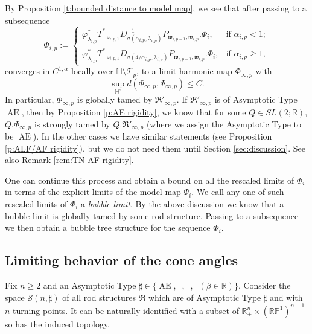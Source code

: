 \documentclass[a4paper,11pt]{amsart}
\theoremstyle{definition}
\numberwithin{equation}{section}
\newcommand{\dH}{\mathbb{H}}
\newcommand{\R}{\mathbb{R}}
\newcommand{\dP}{\mathbb{P}}
\newcommand{\mw} {\mathfrak w}
\newcommand{\mR} {\mathfrak R}
\DeclareMathOperator{\Ae}{AE}
\DeclareMathOperator{\ALFp}{ALF^+}
\DeclareMathOperator{\ALFm}{ALF^{--}}
\DeclareMathOperator{\AFa}{AF_\beta}
\begin{document}
By Proposition \ref{t:bounded distance to model map}, we see that after passing to a subsequence 
\begin{equation}\label{eq:harmonic map in the scale of mC}
   \Phi_{i,p}:=\begin{cases}
       \varphi_{\lambda_{i, p}}^*T_{-z_{i,p,1}}^* D_{\sigma(\alpha_{i, p}, \lambda_{i, p})}^{-1}P_{\mw_{i,p-1},\mw_{i,p}}.\Phi_{i}, &\text{if }\alpha_{i,p}<1;\\
       \varphi_{\lambda_{i, p}}^*T_{-z_{i,p,1}}^* D_{\sigma(4/\alpha_{i, p}, \lambda_{i, p})}P_{\mw_{i,p-1},\mw_{i,p}}.\Phi_{i}, &\text{if }\alpha_{i,p}\geq1,
   \end{cases}  
\end{equation}
converges in $C^{1, \alpha}$ locally over $\dH\setminus\mathcal T_p$, to a limit harmonic map $\Phi_{\infty, p}$  with
$$\sup_{\dH^\circ} d(\Phi_{\infty, p}, \Psi_{\infty, p})\leq C.$$
In particular,  $\Phi_{\infty, p}$ is globally tamed by $\mR'_{\infty, p}$. If $\mR'_{\infty, p}$ is of  Asymptotic Type  $\Ae$, then by Proposition \ref{p:AE rigidity}, we know that for some $Q\in SL(2; \R)$, $Q.\Phi_{\infty, p}$ is strongly tamed by $Q.\mR'_{\infty, p}$ (where we assign the Asymptotic Type to be $\Ae$). In the other cases we have similar statements (see Proposition \ref{p:ALF/AF rigidity}), but we do not need them until Section \ref{sec:discussion}.  See also Remark \ref{rem:TN AF rigidity}. 



One can continue this process and obtain a bound on all the rescaled limits of $\Phi_i$ in terms of the explicit limits of the model map $\Psi_i$. We call any one of such rescaled limits of $\Phi_i$ a \emph{bubble limit}.
By the above discussion we know that a bubble limit is globally tamed by some rod structure. Passing to a subsequence we then obtain a bubble tree structure for the sequence $\Phi_i$.





 



\subsection{Limiting behavior of the cone angles}
\label{ss:limiting behavior of the cone angles}


Fix  $n\geq 2$ and an Asymptotic Type $\sharp\in \{\Ae, \ALFm,\ALFp, \AFa(\beta\in \R)\}$. 
Consider the space $\mathcal S(n, \sharp)$ of all rod structures $\mR$ which are of  Asymptotic Type  $\sharp$ and with $n$ turning points. It can be naturally identified with a subset of $\R_{+}^{n}\times (\R\dP^1)^{n+1}$ so has the induced topology.
\end{document}
